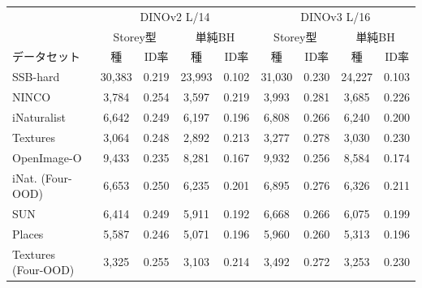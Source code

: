 {\fontsize{6.0pt}{7.1pt}\selectfont\renewcommand{\arraystretch}{1.0}%
\setlength{\tabcolsep}{1.3pt}\begin{tabular}{@{}lcccc|cccc@{}}
\hline
\rule[-2.0pt]{0pt}{8.2pt} & \multicolumn{4}{c|}{DINOv2 L/14} & \multicolumn{4}{c}{DINOv3 L/16} \\
\rule[-2.0pt]{0pt}{8.2pt} & \multicolumn{2}{c}{Storey型} & \multicolumn{2}{c|}{単純BH} & \multicolumn{2}{c}{Storey型} & \multicolumn{2}{c}{単純BH} \\
\rule[-2.0pt]{0pt}{8.2pt}データセット & 種 & ID率 & 種 & ID率 & 種 & ID率 & 種 & ID率 \\
\hline
SSB-hard & 30,383 & 0.219 & 23,993 & 0.102 & 31,030 & 0.230 & 24,227 & 0.103 \\
NINCO & 3,784 & 0.254 & 3,597 & 0.219 & 3,993 & 0.281 & 3,685 & 0.226 \\
iNaturalist & 6,642 & 0.249 & 6,197 & 0.196 & 6,808 & 0.266 & 6,240 & 0.200 \\
Textures & 3,064 & 0.248 & 2,892 & 0.213 & 3,277 & 0.278 & 3,030 & 0.230 \\
OpenImage-O & 9,433 & 0.235 & 8,281 & 0.167 & 9,932 & 0.256 & 8,584 & 0.174 \\
iNat. (Four-OOD) & 6,653 & 0.250 & 6,235 & 0.201 & 6,895 & 0.276 & 6,326 & 0.211 \\
SUN & 6,414 & 0.249 & 5,911 & 0.192 & 6,668 & 0.266 & 6,075 & 0.199 \\
Places & 5,587 & 0.246 & 5,071 & 0.196 & 5,960 & 0.260 & 5,313 & 0.196 \\
Textures (Four-OOD) & 3,325 & 0.255 & 3,103 & 0.214 & 3,492 & 0.272 & 3,253 & 0.230 \\
\hline
\end{tabular}}%
